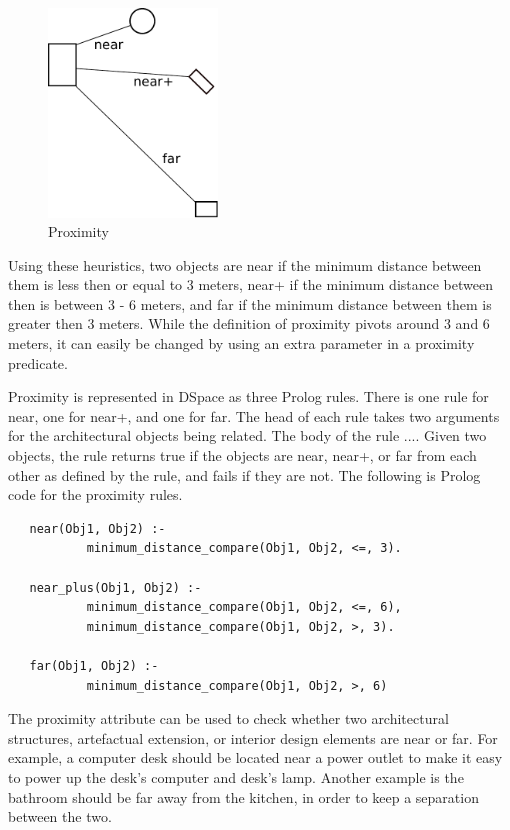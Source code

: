 \documentclass[12pt]{ucthesis}
\begin{document}
\begin{figure}[H]
\centering
\includegraphics[width=45mm]{proximity}
\caption{Proximity}
\label{proximity}
\end{figure}

Using these heuristics, two objects are near if the minimum distance between them is less then or equal to 3 meters, near+ if the minimum distance between then is between 3 - 6 meters, and far if the minimum distance between them is greater then 3 meters. While the definition of proximity pivots around 3 and 6 meters, it can easily be changed by using an extra parameter in a proximity predicate. 

Proximity is represented in DSpace as three Prolog rules. There is one rule for near, one for near+, and one for far. The head of each rule takes two arguments for the architectural objects being related. The body of the rule .... Given two objects, the rule returns true if the objects are near, near+, or far from each other as defined by the rule, and fails if they are not. The following is Prolog code for the proximity rules.

\begin{verbatim}
   near(Obj1, Obj2) :- 
           minimum_distance_compare(Obj1, Obj2, <=, 3).
   
   near_plus(Obj1, Obj2) :-
           minimum_distance_compare(Obj1, Obj2, <=, 6),
           minimum_distance_compare(Obj1, Obj2, >, 3).   
   
   far(Obj1, Obj2) :- 
           minimum_distance_compare(Obj1, Obj2, >, 6)

\end{verbatim}

The proximity attribute can be used to check whether two architectural structures, artefactual extension, or interior design elements are near or far. For example, a computer desk should be located near a power outlet to make it easy to power up the desk's computer and desk's lamp. Another example is the bathroom should be far away from the kitchen, in order to keep a separation between the two.
\end{document}
